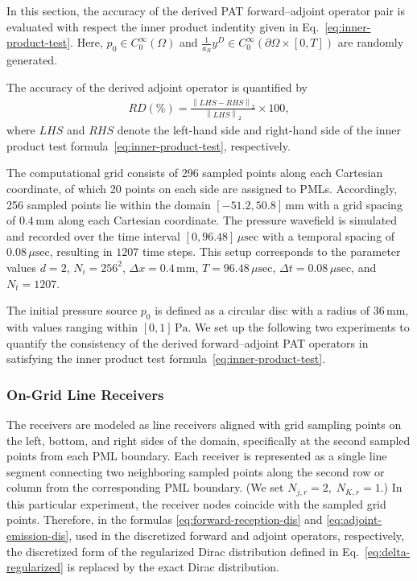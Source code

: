 \documentclass[11pt,reqno]{amsart}
\theoremstyle{remark}
\begin{document}
In this section, the accuracy of the derived PAT forward--adjoint operator pair is evaluated with respect the inner product indentity given in Eq.~\eqref{eq:inner-product-test}. Here, \( p_0 \in C_0^\infty(\Omega) \) and \( \frac{1}{a_R} y^D \in C_0^\infty(\partial\Omega \times [0,T]) \) are randomly generated. 

The accuracy of the derived adjoint operator is quantified by
\begin{align} \label{eq:inner-product-test-measure}
RD(\%) = \frac{\left\| LHS - RHS \right\|_2}{\left\| LHS \right\|_2} \times 100,
\end{align}
where \(LHS\) and \(RHS\) denote the left-hand side and right-hand side of the inner product test formula~\eqref{eq:inner-product-test}, respectively.

The computational grid consists of 296 sampled points along each Cartesian coordinate, of which 20 points on each side are assigned to PMLs. Accordingly, 256 sampled points lie within the domain \([-51.2, 50.8]\,\mathrm{mm}\) with a grid spacing of \(0.4\,\mathrm{mm}\) along each Cartesian coordinate. The pressure wavefield is simulated and recorded over the time interval \([0, 96.48]\,\mu\mathrm{sec}\) with a temporal spacing of \(0.08\,\mu\mathrm{sec}\), resulting in \(1207\) time steps. This setup corresponds to the parameter values \(d = 2\), \(N_i = 256^2\), \(\Delta x = 0.4\,\mathrm{mm}\), \(T = 96.48\,\mu\mathrm{sec}\), \(\Delta t = 0.08\,\mu\mathrm{sec}\), and \(N_t = 1207\).

The initial pressure source \(p_0\) is defined as a circular disc with a radius of \(36\,\mathrm{mm}\), with values ranging within \([0,1]\,\mathrm{Pa}\). We set up the following two experiments to quantify the consistency of the derived forward--adjoint PAT operators in satisfying the inner product test formula~\eqref{eq:inner-product-test}.

\subsubsection{On-Grid Line Receivers}

The receivers are modeled as line receivers aligned with grid sampling points on the left, bottom, and right sides of the domain, specifically at the second sampled points from each PML boundary. Each receiver is represented as a single line segment connecting two neighboring sampled points along the second row or column from the corresponding PML boundary. (We set $N_{j,r}=2,\; N_{K,r}=1$.) In this particular experiment, the receiver nodes coincide with the sampled grid points. Therefore, in the formulas \eqref{eq:forward-reception-dis} and \eqref{eq:adjoint-emission-dis}, used in the discretized forward and adjoint operators, respectively, the discretized form of the regularized Dirac distribution defined in Eq.~\eqref{eq:delta-regularized} is replaced by the exact Dirac distribution.
\end{document}
